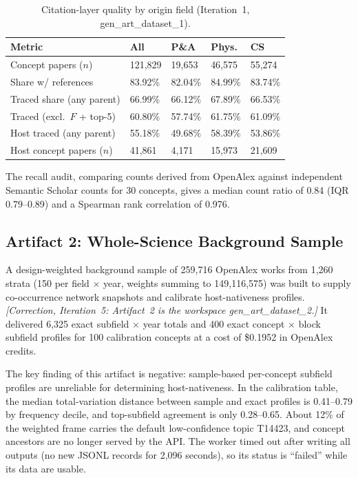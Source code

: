 \documentclass[11pt,letterpaper]{article}
\begin{document}
\begin{table}[!htbp]
\centering
\caption{Citation-layer quality by origin field (Iteration~1, gen\_art\_dataset\_1).}
\label{tab:gate_a_iter1}
{\footnotesize
\begin{tabular}{L{2.8cm}R{1cm}R{1cm}R{1cm}R{1cm}}
\toprule
Metric & All & P\&A & Phys. & CS \\
\midrule
Concept papers ($n$) & 121,829 & 19,653 & 46,575 & 55,274 \\
Share w/ references & 83.92\% & 82.04\% & 84.99\% & 83.74\% \\
Traced share (any parent) & 66.99\% & 66.12\% & 67.89\% & 66.53\% \\
Traced (excl.\ $F$ + top-5) & 60.80\% & 57.74\% & 61.75\% & 61.09\% \\
Host traced (any parent) & 55.18\% & 49.68\% & 58.39\% & 53.86\% \\
Host concept papers ($n$) & 41,861 & 4,171 & 15,973 & 21,609 \\
\bottomrule
\end{tabular}
}
\end{table}

The recall audit, comparing counts derived from OpenAlex against independent Semantic Scholar counts for 30 concepts, gives a median count ratio of 0.84 (IQR 0.79--0.89) and a Spearman rank correlation of 0.976.

\subsection{Artifact 2: Whole-Science Background Sample}

A design-weighted background sample of 259,716 OpenAlex works from 1,260 strata (150 per field $\times$ year, weights summing to 149,116,575) was built to supply co-occurrence network snapshots and calibrate host-nativeness profiles.
\emph{[Correction, Iteration~5: Artifact~2 is the workspace gen\_art\_dataset\_2.]}
It delivered 6,325 exact subfield $\times$ year totals and 400 exact concept $\times$ block subfield profiles for 100 calibration concepts at a cost of \$0.1952 in OpenAlex credits.

The key finding of this artifact is negative: sample-based per-concept subfield profiles are unreliable for determining host-nativeness.
In the calibration table, the median total-variation distance between sample and exact profiles is 0.41--0.79 by frequency decile, and top-subfield agreement is only 0.28--0.65.
About 12\% of the weighted frame carries the default low-confidence topic T14423, and concept ancestors are no longer served by the API.
The worker timed out after writing all outputs (no new JSONL records for 2,096 seconds), so its status is ``failed'' while its data are usable.
\end{document}

